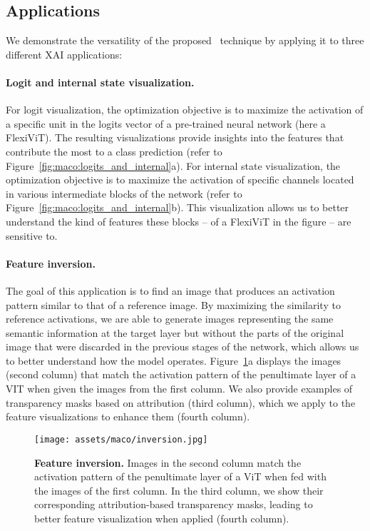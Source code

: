 \subsection{Applications}

We demonstrate the versatility of the proposed \magfv~technique by applying it to three different XAI applications:

\paragraph{Logit and internal state visualization.} For logit visualization, the optimization objective is to maximize the activation of a specific unit in the logits vector of a pre-trained neural network (here a FlexiViT\cite{beyer2022flexivit}). The resulting visualizations provide insights into the features that contribute the most to a class prediction (refer to Figure~\ref{fig:maco:logits_and_internal}a). For internal state visualization, the optimization objective is to maximize the activation of specific channels located in various intermediate blocks of the network (refer to Figure~\ref{fig:maco:logits_and_internal}b). This visualization allows us to better understand the kind of features these blocks -- of a FlexiViT\cite{beyer2022flexivit} in the figure -- are sensitive to.

\paragraph{Feature inversion.} The goal of this application is to find an image that produces an activation pattern similar to that of a reference image. By maximizing the similarity to reference activations, we are able to generate images representing the same semantic information at the target layer but without the parts of the original image that were discarded in the previous stages of the network, which allows us to better understand how the model operates.
Figure~\ref{fig:maco:inversion}a displays the images (second column) that match the activation pattern of the penultimate layer of a VIT when given the images from the first column. We also provide examples of transparency masks based on attribution (third column), which we apply to the feature visualizations to enhance them (fourth column).



\begin{figure}
    \centering
    \texttt{[image: assets/maco/inversion.jpg]}
    \caption{\textbf{Feature inversion.} Images in the second column match the activation pattern of the penultimate layer of a ViT when fed with the images of the first column. In the third column, we show their corresponding attribution-based transparency masks, leading to better feature visualization when applied (fourth column).}
    \label{fig:maco:inversion}
\end{figure}


